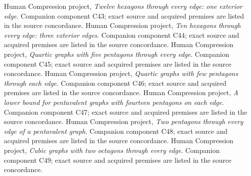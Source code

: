  Human Compression project, \emph{Twelve hexagons through every edge: one exterior edge}. Companion component C43; exact source and acquired premises are listed in the source concordance.
 Human Compression project, \emph{Ten hexagons through every edge: three exterior edges}. Companion component C44; exact source and acquired premises are listed in the source concordance.
 Human Compression project, \emph{Quartic graphs with five pentagons through every edge}. Companion component C45; exact source and acquired premises are listed in the source concordance.
 Human Compression project, \emph{Quartic graphs with few pentagons through each edge}. Companion component C46; exact source and acquired premises are listed in the source concordance.
 Human Compression project, \emph{A lower bound for pentavalent graphs with fourteen pentagons on each edge}. Companion component C47; exact source and acquired premises are listed in the source concordance.
 Human Compression project, \emph{Two pentagons through every edge of a pentavalent graph}. Companion component C48; exact source and acquired premises are listed in the source concordance.
 Human Compression project, \emph{Cubic graphs with two octagons through every edge}. Companion component C49; exact source and acquired premises are listed in the source concordance.
